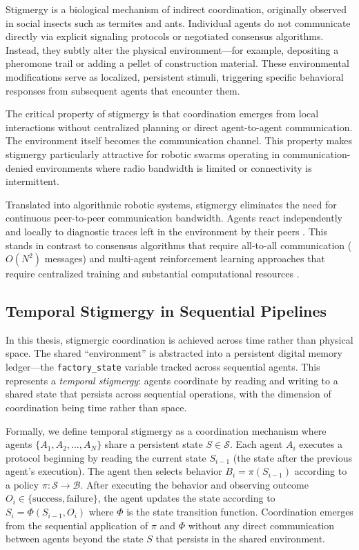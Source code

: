 \documentclass[12pt,a4paper,oneside]{report}
\begin{document}
Stigmergy is a biological mechanism of indirect coordination, originally observed in social insects such as termites and ants. Individual agents do not communicate directly via explicit signaling protocols or negotiated consensus algorithms. Instead, they subtly alter the physical environment—for example, depositing a pheromone trail or adding a pellet of construction material. These environmental modifications serve as localized, persistent stimuli, triggering specific behavioral responses from subsequent agents that encounter them.

The critical property of stigmergy is that coordination emerges from local interactions without centralized planning or direct agent-to-agent communication. The environment itself becomes the communication channel. This property makes stigmergy particularly attractive for robotic swarms operating in communication-denied environments where radio bandwidth is limited or connectivity is intermittent.

Translated into algorithmic robotic systems, stigmergy eliminates the need for continuous peer-to-peer communication bandwidth. Agents react independently and locally to diagnostic traces left in the environment by their peers \cite{bongard2006resilient}. This stands in contrast to consensus algorithms that require all-to-all communication ($O(N^2)$ messages) and multi-agent reinforcement learning approaches that require centralized training and substantial computational resources \cite{domberg2026selfadapting, daneshmand2026slowrl}.

\subsection{Temporal Stigmergy in Sequential Pipelines}
\label{subsec:temporal_stigmergy_in_sequential_pipelines}

In this thesis, stigmergic coordination is achieved across time rather than physical space. The shared ``environment'' is abstracted into a persistent digital memory ledger—the \texttt{factory\_state} variable tracked across sequential agents. This represents a \textit{temporal stigmergy}: agents coordinate by reading and writing to a shared state that persists across sequential operations, with the dimension of coordination being time rather than space.

Formally, we define temporal stigmergy as a coordination mechanism where agents $\{A_1, A_2, \ldots, A_N\}$ share a persistent state $S \in \mathcal{S}$. Each agent $A_i$ executes a protocol beginning by reading the current state $S_{i-1}$ (the state after the previous agent's execution). The agent then selects behavior $B_i = \pi(S_{i-1})$ according to a policy $\pi: \mathcal{S} \rightarrow \mathcal{B}$. After executing the behavior and observing outcome $O_i \in \{\text{success}, \text{failure}\}$, the agent updates the state according to $S_i = \Phi(S_{i-1}, O_i)$ where $\Phi$ is the state transition function. Coordination emerges from the sequential application of $\pi$ and $\Phi$ without any direct communication between agents beyond the state $S$ that persists in the shared environment.
\end{document}

